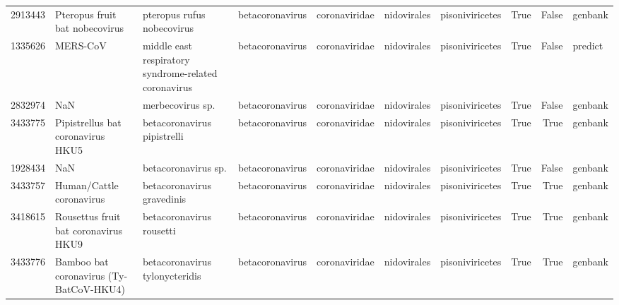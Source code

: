 \begin{tabular}{rllllllrrl}
2913443 & Pteropus fruit bat nobecovirus & pteropus rufus nobecovirus & betacoronavirus & coronaviridae & nidovirales & pisoniviricetes & True & False & genbank \\
1335626 & MERS-CoV & middle east respiratory syndrome-related coronavirus & betacoronavirus & coronaviridae & nidovirales & pisoniviricetes & True & False & predict \\
2832974 & NaN & merbecovirus sp. & betacoronavirus & coronaviridae & nidovirales & pisoniviricetes & True & False & genbank \\
3433775 & Pipistrellus bat coronavirus HKU5 & betacoronavirus pipistrelli & betacoronavirus & coronaviridae & nidovirales & pisoniviricetes & True & True & genbank \\
1928434 & NaN & betacoronavirus sp. & betacoronavirus & coronaviridae & nidovirales & pisoniviricetes & True & False & genbank \\
3433757 & Human/Cattle coronavirus & betacoronavirus gravedinis & betacoronavirus & coronaviridae & nidovirales & pisoniviricetes & True & True & genbank \\
3418615 & Rousettus fruit bat coronavirus HKU9 & betacoronavirus rousetti & betacoronavirus & coronaviridae & nidovirales & pisoniviricetes & True & True & genbank \\
3433776 & Bamboo bat coronavirus (Ty-BatCoV-HKU4) & betacoronavirus tylonycteridis & betacoronavirus & coronaviridae & nidovirales & pisoniviricetes & True & True & genbank \\
\bottomrule
\end{tabular}
